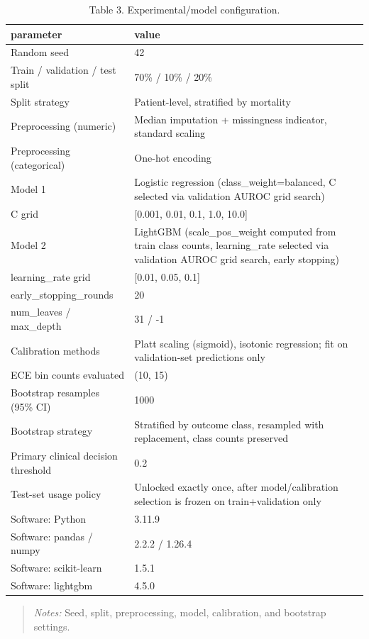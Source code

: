 \begin{table}[htbp]
\centering
\caption{Table 3. Experimental/model configuration.}
\label{table3_experimental_configuration}
\begin{tabular}{ll}
\toprule
parameter & value \\
\midrule
Random seed & 42 \\
Train / validation / test split & 70\% / 10\% / 20\% \\
Split strategy & Patient-level, stratified by mortality \\
Preprocessing (numeric) & Median imputation + missingness indicator, standard scaling \\
Preprocessing (categorical) & One-hot encoding \\
Model 1 & Logistic regression (class\_weight=balanced, C selected via validation AUROC grid search) \\
  C grid & [0.001, 0.01, 0.1, 1.0, 10.0] \\
Model 2 & LightGBM (scale\_pos\_weight computed from train class counts, learning\_rate selected via validation AUROC grid search, early stopping) \\
  learning\_rate grid & [0.01, 0.05, 0.1] \\
  early\_stopping\_rounds & 20 \\
  num\_leaves / max\_depth & 31 / -1 \\
Calibration methods & Platt scaling (sigmoid), isotonic regression; fit on validation-set predictions only \\
ECE bin counts evaluated & (10, 15) \\
Bootstrap resamples (95\% CI) & 1000 \\
Bootstrap strategy & Stratified by outcome class, resampled with replacement, class counts preserved \\
Primary clinical decision threshold & 0.2 \\
Test-set usage policy & Unlocked exactly once, after model/calibration selection is frozen on train+validation only \\
Software: Python & 3.11.9 \\
Software: pandas / numpy & 2.2.2 / 1.26.4 \\
Software: scikit-learn & 1.5.1 \\
Software: lightgbm & 4.5.0 \\
\bottomrule
\end{tabular}

\end{table}


\begin{quote}\small
\textit{Notes:} Seed, split, preprocessing, model, calibration, and bootstrap settings.
\end{quote}